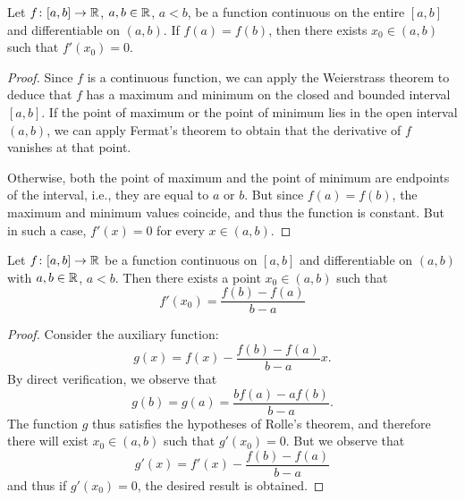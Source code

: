 \begin{theorem}[Rolle]
\mymark{***}
%
Let $f\colon [a,b]\to {\mathbb R}$, $a,b\in {\mathbb R}$, $a<b$, be a function continuous on the
entire $[a,b]$ and differentiable on $(a,b)$.
%
If $f(a) = f(b)$, then there exists $x_0 \in (a,b)$ such that $f'(x_0)=0$.
\end{theorem}
%
\begin{proof}
\mymark{***}
Since $f$ is a continuous function,
we can apply the Weierstrass theorem to deduce that $f$ has a maximum and 
minimum on the closed and bounded interval $[a,b]$. 
If the point of maximum or the point of minimum lies in the open interval 
$(a,b)$, we can apply Fermat's theorem to obtain that the derivative 
of $f$ vanishes at that point.

Otherwise, both the point of maximum and the point of minimum are endpoints 
of the interval, i.e., they are equal to $a$ or $b$. But since $f(a)=f(b)$, 
the maximum and minimum values coincide, and thus the function is constant. 
But in such a case, $f'(x)=0$ for every $x\in (a,b)$.
\end{proof}

\begin{theorem}[Lagrange]\label{th:lagrange}%
\mymark{***}%
%
%
%
Let $f\colon [a,b]\to {\mathbb R}$ be a function continuous on $[a,b]$ and
differentiable on $(a,b)$
with $a,b\in {\mathbb R}$, $a<b$.
%
Then there exists a point $x_0\in (a,b)$ such that
\[
  f'(x_0) = \frac{f(b) - f(a)}{b-a}
\]
\end{theorem}
%
\begin{proof}
\mymark{***}
Consider the auxiliary function:
\[
  g(x) = f(x) - \frac{f(b)-f(a)}{b-a} x.
\]
By direct verification, we observe that
\[
  g(b) = g(a) = \frac{b f(a) - a f(b)}{b-a}.
\]
The function $g$ thus satisfies the hypotheses of Rolle's theorem, and therefore
there will exist $x_0\in (a,b)$ such that $g'(x_0)=0$.
But we observe that
\[
  g'(x) = f'(x) - \frac{f(b)-f(a)}{b-a}
\]
and thus if $g'(x_0)=0$, the desired result is obtained.
\end{proof}


